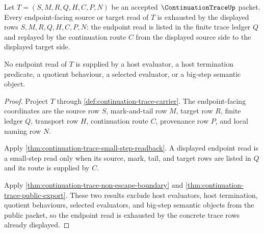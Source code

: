 \begin{theorem}
\label{thm:continuation-trace-endpoint-ledger-exhaustion}
Let $T=(S,M,R,Q,H,C,P,N)$ be an accepted $\ContinuationTraceUp$ packet. Every endpoint-facing source or target read of $T$ is exhausted by the displayed rows $S,M,R,Q,H,C,P,N$: the endpoint read is listed in the finite trace ledger $Q$ and replayed by the continuation route $C$ from the displayed source side to the displayed target side.

No endpoint read of $T$ is supplied by a host evaluator, a host termination predicate, a quotient behaviour, a selected evaluator, or a big-step semantic object.
\end{theorem}
\begin{proof}
Project $T$ through \autoref{def:continuation-trace-carrier}. The endpoint-facing coordinates are the source row $S$, mark-and-tail row $M$, target row $R$, finite ledger $Q$, transport row $H$, continuation route $C$, provenance row $P$, and local naming row $N$.

Apply \autoref{thm:continuation-trace-small-step-readback}. A displayed endpoint read is a small-step read only when its source, mark, tail, and target rows are listed in $Q$ and its route is supplied by $C$.

Apply \autoref{thm:continuation-trace-non-escape-boundary} and \autoref{thm:continuation-trace-public-export}. These two results exclude host evaluators, host termination, quotient behaviours, selected evaluators, and big-step semantic objects from the public packet, so the endpoint read is exhausted by the concrete trace rows already displayed.
\end{proof}


